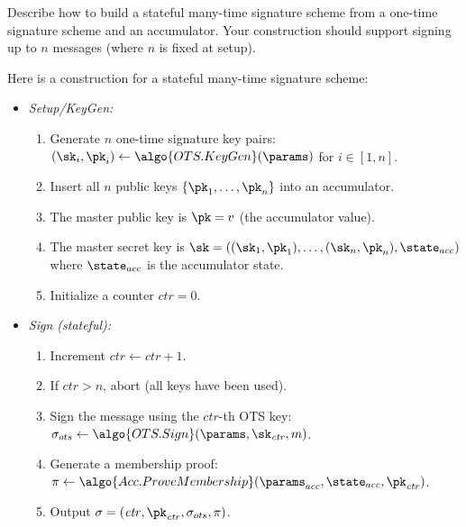 \begin{exercise}[Optional]
  Describe how to build a stateful many-time signature scheme from a one-time signature scheme and an accumulator.
  Your construction should support signing up to $n$ messages (where $n$ is fixed at setup).
\end{exercise}

\ifsolutions
\begin{mysolution}
  Here is a construction for a stateful many-time signature scheme:
  \begin{itemize}
    \item \emph{Setup/KeyGen:} 
      \begin{enumerate}
        \item Generate $n$ one-time signature key pairs: $(\sk_i, \pk_i) \gets \algo{OTS.KeyGen}(\params)$ for $i \in [1,n]$.
        \item Insert all $n$ public keys $\{\pk_1, \ldots, \pk_n\}$ into an accumulator.
        \item The master public key is $\pk = v$ (the accumulator value).
        \item The master secret key is $\sk = ((\sk_1, \pk_1), \ldots, (\sk_n, \pk_n), \state_{acc})$ where $\state_{acc}$ is the accumulator state.
        \item Initialize a counter $\mathit{ctr} = 0$.
      \end{enumerate}
    \item \emph{Sign (stateful):}
      \begin{enumerate}
        \item Increment $\mathit{ctr} \gets \mathit{ctr} + 1$.
        \item If $\mathit{ctr} > n$, abort (all keys have been used).
        \item Sign the message using the $\mathit{ctr}$-th OTS key: $\sigma_{ots} \gets \algo{OTS.Sign}(\params, \sk_{\mathit{ctr}}, m)$.
        \item Generate a membership proof: $\pi \gets \algo{Acc.ProveMembership}(\params_{acc}, \state_{acc}, \pk_{\mathit{ctr}})$.
        \item Output $\sigma = (\mathit{ctr}, \pk_{\mathit{ctr}}, \sigma_{ots}, \pi)$.
      \end{enumerate}

\end{itemize}
\end{mysolution}
